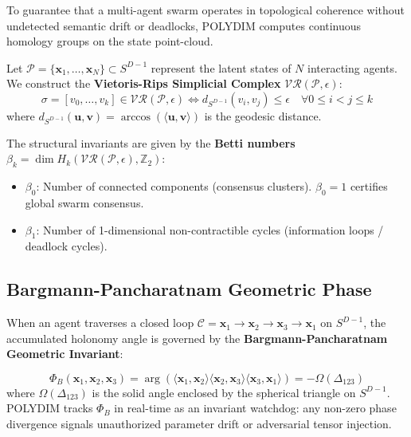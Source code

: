 \documentclass[11pt,twoside,a4paper]{article}
\theoremstyle{plain}
\theoremstyle{definition}
\theoremstyle{remark}
\begin{document}
To guarantee that a multi-agent swarm operates in topological coherence without undetected semantic drift or deadlocks, POLYDIM computes continuous homology groups on the state point-cloud.

Let $\mathcal{P} = \{\mathbf{x}_1, \dots, \mathbf{x}_N\} \subset S^{D-1}$ represent the latent states of $N$ interacting agents. We construct the \textbf{Vietoris-Rips Simplicial Complex} $\mathcal{VR}(\mathcal{P}, \epsilon)$:
\begin{equation}
\sigma = [v_0, \dots, v_k] \in \mathcal{VR}(\mathcal{P}, \epsilon) \iff d_{S^{D-1}}(v_i, v_j) \le \epsilon \quad \forall 0 \le i < j \le k
\end{equation}
where $d_{S^{D-1}}(\mathbf{u}, \mathbf{v}) = \arccos(\langle \mathbf{u}, \mathbf{v} \rangle)$ is the geodesic distance.

The structural invariants are given by the \textbf{Betti numbers} $\beta_k = \dim H_k(\mathcal{VR}(\mathcal{P}, \epsilon), \mathbb{Z}_2)$:
\begin{itemize}
    \item $\beta_0$: Number of connected components (consensus clusters). $\beta_0 = 1$ certifies global swarm consensus.
    \item $\beta_1$: Number of 1-dimensional non-contractible cycles (information loops / deadlock cycles).
\end{itemize}

\subsection{Bargmann-Pancharatnam Geometric Phase}

When an agent traverses a closed loop $\mathcal{C} = \mathbf{x}_1 \to \mathbf{x}_2 \to \mathbf{x}_3 \to \mathbf{x}_1$ on $S^{D-1}$, the accumulated holonomy angle is governed by the \textbf{Bargmann-Pancharatnam Geometric Invariant}:

\begin{equation}
\Phi_B(\mathbf{x}_1, \mathbf{x}_2, \mathbf{x}_3) = \arg\left( \langle \mathbf{x}_1, \mathbf{x}_2 \rangle \langle \mathbf{x}_2, \mathbf{x}_3 \rangle \langle \mathbf{x}_3, \mathbf{x}_1 \rangle \right) = -\Omega(\Delta_{123})
\end{equation}
where $\Omega(\Delta_{123})$ is the solid angle enclosed by the spherical triangle on $S^{D-1}$. POLYDIM tracks $\Phi_B$ in real-time as an invariant watchdog: any non-zero phase divergence signals unauthorized parameter drift or adversarial tensor injection.
\end{document}
